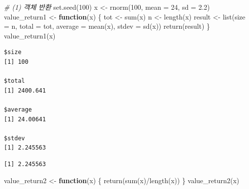 \documentclass[
  11pt,
]{krantz}
\newenvironment{Shaded}{\begin{snugshade}}{\end{snugshade}}
\newcommand{\AttributeTok}[1]{\textcolor[rgb]{0.61,0.61,0.61}{#1}}
\newcommand{\CommentTok}[1]{\textcolor[rgb]{0.37,0.37,0.37}{\textit{#1}}}
\newcommand{\ControlFlowTok}[1]{\textcolor[rgb]{0.27,0.27,0.27}{\textbf{#1}}}
\newcommand{\DecValTok}[1]{\textcolor[rgb]{0.06,0.06,0.06}{#1}}
\newcommand{\FloatTok}[1]{\textcolor[rgb]{0.06,0.06,0.06}{#1}}
\newcommand{\FunctionTok}[1]{\textcolor[rgb]{0,0,0}{#1}}
\newcommand{\NormalTok}[1]{#1}
\newcommand{\OtherTok}[1]{\textcolor[rgb]{0.37,0.37,0.37}{#1}}
\newcommand{\SpecialCharTok}[1]{\textcolor[rgb]{0,0,0}{#1}}
\begin{document}
\begin{Shaded}
\begin{Highlighting}[]
\CommentTok{\# (1) 객체 반환}
\FunctionTok{set.seed}\NormalTok{(}\DecValTok{100}\NormalTok{)}
\NormalTok{x }\OtherTok{\textless{}{-}} \FunctionTok{rnorm}\NormalTok{(}\DecValTok{100}\NormalTok{, }\AttributeTok{mean =} \DecValTok{24}\NormalTok{, }\AttributeTok{sd =} \FloatTok{2.2}\NormalTok{)}
\NormalTok{value\_return1 }\OtherTok{\textless{}{-}} \ControlFlowTok{function}\NormalTok{(x) \{}
\NormalTok{  tot }\OtherTok{\textless{}{-}} \FunctionTok{sum}\NormalTok{(x)}
\NormalTok{  n }\OtherTok{\textless{}{-}} \FunctionTok{length}\NormalTok{(x)}
\NormalTok{  result }\OtherTok{\textless{}{-}} \FunctionTok{list}\NormalTok{(}\AttributeTok{size =}\NormalTok{ n, }\AttributeTok{total =}\NormalTok{ tot, }\AttributeTok{average =} \FunctionTok{mean}\NormalTok{(x), }\AttributeTok{stdev =} \FunctionTok{sd}\NormalTok{(x))}
  \FunctionTok{return}\NormalTok{(result)}
\NormalTok{\}}
\FunctionTok{value\_return1}\NormalTok{(x)}
\end{Highlighting}
\end{Shaded}

\begin{verbatim}
$size
[1] 100

$total
[1] 2400.641

$average
[1] 24.00641

$stdev
[1] 2.245563
\end{verbatim}

\begin{Shaded}
\end{Shaded}

\begin{verbatim}
[1] 2.245563
\end{verbatim}

\begin{Shaded}
\begin{Highlighting}[]
\NormalTok{value\_return2 }\OtherTok{\textless{}{-}} \ControlFlowTok{function}\NormalTok{(x) \{}
  \FunctionTok{return}\NormalTok{(}\FunctionTok{sum}\NormalTok{(x)}\SpecialCharTok{/}\FunctionTok{length}\NormalTok{(x))}
\NormalTok{\}}
\FunctionTok{value\_return2}\NormalTok{(x)}
\end{Highlighting}
\end{Shaded}
\end{document}

